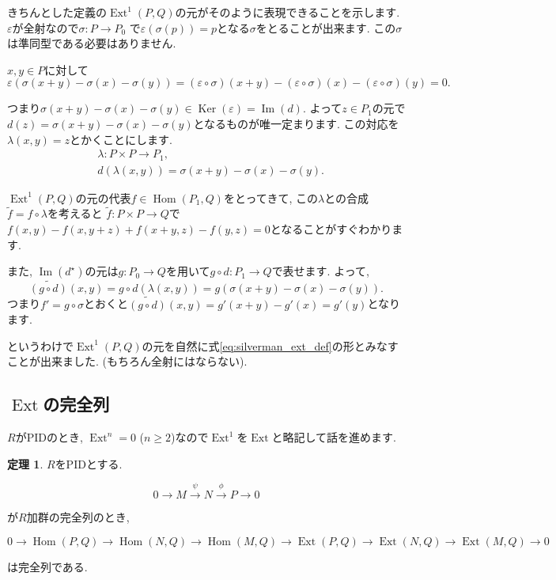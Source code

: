\documentclass{jsarticle}
\newcommand{\makeop}[1]{\mathop{\mathrm{#1}}\nolimits}
\def\Im{\makeop{Im}}
\def\Ker{\makeop{Ker}}
\def\Hom{\makeop{Hom}}
\def\Ext{\makeop{Ext}}
\theoremstyle{definition}
\newtheorem{theorem}{定理}
\numberwithin{theorem}{section}
\begin{document}
きちんとした定義の$\Ext^1(P, Q)$の元がそのように表現できることを示します. $\varepsilon$が全射なので$\sigma : P \rightarrow P_0$
で$\varepsilon(\sigma(p)) = p$となる$\sigma$をとることが出来ます. この$\sigma$は準同型である必要はありません.

$x, y \in P$に対して
\[
\varepsilon(\sigma(x+y) - \sigma(x) - \sigma(y)) = (\varepsilon\circ\sigma)(x+y) - (\varepsilon\circ\sigma)(x) - (\varepsilon\circ\sigma)(y) = 0.
\]

つまり$\sigma(x+y) - \sigma(x) - \sigma(y) \in \Ker(\varepsilon) = \Im(d)$. よって$z\in P_1$の元で
$d(z) = \sigma(x+y) - \sigma(x) - \sigma(y)$となるものが唯一定まります. この対応を$\lambda(x, y) = z$とかくことにします.
\begin{align*}
& \lambda: P\times P \rightarrow P_1,\\
& d(\lambda(x, y)) = \sigma(x+y) - \sigma(x) - \sigma(y).
\end{align*}

$\Ext^1(P, Q)$の元の代表$f\in\Hom(P_1, Q)$をとってきて, この$\lambda$との合成$\tilde{f} = f\circ\lambda$を考えると
$\tilde{f} : P \times P \rightarrow Q$で$f(x, y) - f(x, y+z) + f(x+y, z) - f(y, z) = 0$となることがすぐわかります.

また, $\Im(d^\star)$の元は$g: P_0 \rightarrow Q$を用いて$g\circ d: P_1 \rightarrow Q$で表せます. よって,
\[
\widetilde{(g\circ d)} (x, y) = g\circ d(\lambda(x, y)) = g(\sigma(x+y) - \sigma(x) - \sigma(y)).
\]
つまり$f' = g\circ\sigma$とおくと$\widetilde{(g\circ d)}(x, y) = g'(x+y) - g'(x) = g'(y)$となります. 

というわけで$\Ext^1(P, Q)$の元を自然に式\ref{eq:silverman_ext_def}の形とみなすことが出来ました. (もちろん全射にはならない).

\subsection{$\Ext$の完全列}
$R$がPIDのとき, $\Ext^n = 0$ ($n \geq 2$)なので$\Ext^1$を$\Ext$と略記して話を進めます.

\begin{theorem}
$R$をPIDとする.

\begin{equation*}
0 \rightarrow M \xrightarrow{\psi} N \xrightarrow{\phi} P \rightarrow 0
\end{equation*}

が$R$加群の完全列のとき, 

\begin{equation*}
0 \rightarrow \Hom(P, Q) \rightarrow \Hom(N, Q) \rightarrow \Hom(M, Q) \rightarrow
\Ext(P, Q) \rightarrow \Ext(N, Q) \rightarrow \Ext(M, Q) \rightarrow 0
\end{equation*}

は完全列である.
\end{theorem}
\end{document}
